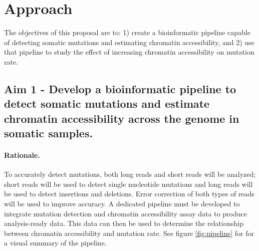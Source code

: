 



\section{Approach}
The objectives of this proposal are to: 1) create a bioinformatic pipeline capable of detecting somatic mutations and estimating chromatin accessibility, and 2) use that pipeline to study the effect of increasing chromatin accessibility on mutation rate.

\subsection{Aim 1 - Develop a bioinformatic pipeline to detect somatic mutations and estimate chromatin accessibility across the genome in somatic samples.}
\paragraph{Rationale.}
To accurately detect mutations, both long reads and short reads will be analyzed; short reads will be used to detect single nucleotide mutations and long reads will be used to detect insertions and deletions. Error correction of both types of reads will be used to improve accuracy.
A dedicated pipeline must be developed to integrate mutation detection and chromatin accessibility assay data to produce analysis-ready data. This data can then be used to determine the relationship between chromatin accessibility and mutation rate.
See figure \ref{fig:pipeline} for for a visual summary of the pipeline.

